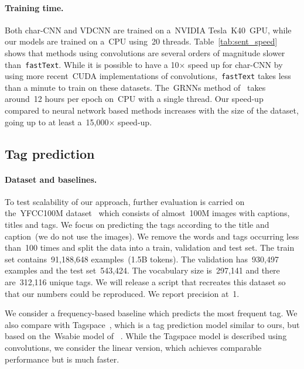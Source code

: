 \paragraph{Training time.}
Both char-CNN and VDCNN are trained on a~NVIDIA Tesla~K40~GPU, while our
models are trained on a~CPU using~20 threads.
Table~\ref{tab:sent_speed} shows that methods using convolutions are several orders of
magnitude slower than~\texttt{fastText}. While it is
possible to have a 10$\times$ speed up for char-CNN by using more recent~CUDA
implementations of convolutions,~\texttt{fastText} takes less than a minute to
train on these datasets. The~GRNNs method of~ takes
around~12 hours per epoch on~CPU with a single thread.
Our speed-up compared to neural network based methods increases with the size
of the dataset, going up to at least a~15,000$\times$ speed-up.

\subsection{Tag prediction}

\paragraph{Dataset and baselines.}
To test scalability of our approach, further evaluation is carried on the~YFCC100M dataset~\cite{ni15} which consists
of almost~100M images with captions, titles and tags.
We focus on predicting the tags according to the title and caption~(we do not use the images).
We remove the words and tags occurring less than~100 times and split the data
into a train, validation and test set.  The train set contains~91,188,648
examples~(1.5B tokens). The validation has~930,497 examples and the test set~543,424. 
The vocabulary size is~297,141 and there are~312,116 unique tags.
We will release a script that recreates this dataset so that our numbers could be reproduced.
We report precision at~1.

We consider a frequency-based baseline which predicts the most frequent tag. We
also compare with Tagspace~\cite{weston2014tagspace}, which is a tag prediction
model similar to ours, but based on the~Wsabie model of
~.  While the Tagspace model is described using
convolutions, we consider the linear version, which achieves comparable
performance but is much faster.

